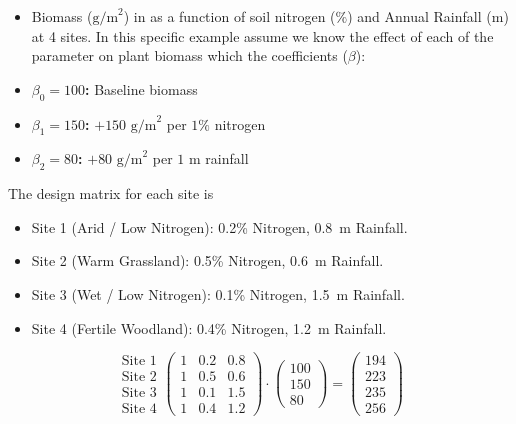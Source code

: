 \documentclass[
  letterpaper,
  DIV=11,
  numbers=noendperiod]{scrreprt}
\providecommand{\tightlist}{%
  \setlength{\itemsep}{0pt}\setlength{\parskip}{0pt}}
\begin{document}
\begin{itemize}
\item
  Biomass (\(\text{g/m}^2\)) in as a function of soil nitrogen (\(\%\))
  and Annual Rainfall (\(\text{m}\)) at 4 sites. In this specific
  example assume we know the effect of each of the parameter on plant
  biomass which the coefficients (\(\beta\)):
\item
  \textbf{\(\beta_0 = 100\):} Baseline biomass
\item
  \textbf{\(\beta_1 = 150\):} \(+150\text{ g/m}^2\) per \(1\%\) nitrogen
\item
  \textbf{\(\beta_2 = 80\):} \(+80\text{ g/m}^2\) per \(1\text{ m}\)
  rainfall
\end{itemize}

The design matrix for each site is

\begin{itemize}
\tightlist
\item
  Site 1 (Arid / Low Nitrogen): 0.2\% Nitrogen, 0.8~m Rainfall.
\item
  Site 2 (Warm Grassland): 0.5\% Nitrogen, 0.6~m Rainfall.
\item
  Site 3 (Wet / Low Nitrogen): 0.1\% Nitrogen, 1.5~m Rainfall.
\item
  Site 4 (Fertile Woodland): 0.4\% Nitrogen, 1.2~m Rainfall.
\end{itemize}

\[
\begin{matrix}
    \text{Site 1} \\
    \text{Site 2} \\
    \text{Site 3} \\
    \text{Site 4}
\end{matrix}
\begin{pmatrix}
  1 & 0.2 & 0.8 \\
  1 & 0.5 & 0.6 \\
  1 & 0.1 & 1.5 \\
  1 & 0.4 & 1.2
\end{pmatrix}
\cdot
\begin{pmatrix}
  100 \\
  150 \\
  80
\end{pmatrix}
 =
\begin{pmatrix}
  194 \\
  223 \\
  235 \\
  256
\end{pmatrix}
\]
\end{document}
